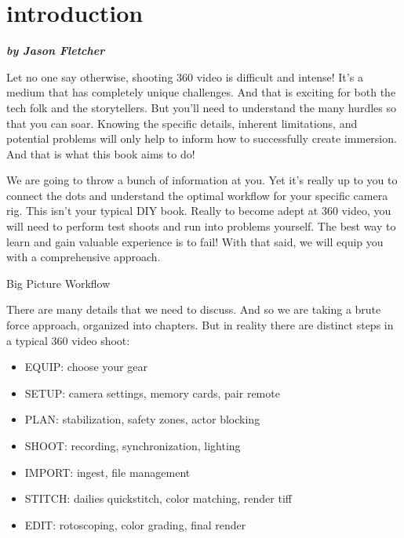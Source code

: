 
\SkipTocEntry\section*{introduction}
\addtocounter{section}{2}
\begin{fullwidth}

{\itshape\bfseries by Jason Fletcher

}

Let no one say otherwise, shooting 360 video is difficult and intense! It’s a medium that has completely unique challenges. And that is exciting for both the tech folk and the storytellers. But you’ll need to understand the many hurdles so that you can soar. Knowing the specific details, inherent limitations, and potential problems will only help to inform how to successfully create immersion. And that is what this book aims to do!

We are going to throw a bunch of information at you. Yet it's really up to you to connect the dots and understand the optimal workflow for your specific camera rig. This isn’t your typical DIY book. Really to become adept at 360 video, you will need to perform test shoots and run into problems yourself. The best way to learn and gain valuable experience is to fail! With that said, we will equip you with a comprehensive approach.

{\large Big Picture Workflow\par}

There are many details that we need to discuss. And so we are taking a brute force approach, organized into chapters. But in reality there are distinct steps in a typical 360 video shoot:

\begin{itemize}
\item EQUIP: choose your gear
\item SETUP: camera settings, memory cards, pair remote
\item PLAN: stabilization, safety zones, actor blocking
\item SHOOT: recording, synchronization, lighting
\item IMPORT: ingest, file management 
\item STITCH: dailies quickstitch, color matching, render tiff
\item EDIT: rotoscoping, color grading, final render
\end{itemize}

\clearpage
\end{fullwidth}
